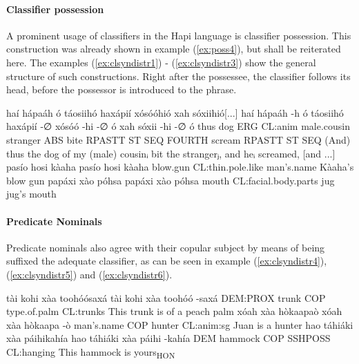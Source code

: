 \documentclass[a4paper, 12pt, oneside]{memoir}
\begin{document}
\paragraph{Classifier possession}
A prominent usage of classifiers in the Hapi language is classifier possession. This construction was already shown in example (\ref{ex:poss4}), but shall be reiterated here. The examples (\ref{ex:clsyndistr1}) - (\ref{ex:clsyndistr3}) show the general structure of such constructions. Right after the possessee, the classifier follows its head, before the possessor is introduced to the phrase. 
\begin{examples}
\newbaarucmd{\cl}{\baarujuncture{\texttt{==}}}
\ex \label{ex:clsyndistr1}
\words haí hápaáh ó táosiihó haxápií xósóóhió xah sóxiihió[...] 
\bits haí hápaáh -h ó táosiihó haxápií -∅ xósóó -hi -∅ \cl ó xah sóxii -hi -∅ \cl ó 
\gloss thus dog ERG CL:anim male.cousin stranger ABS bite RPASTT ST SEQ FOURTH scream RPASTT ST SEQ
\tr (And) thus the dog of my (male) cousinᵢ bit the strangerⱼ, and heᵢ screamed, [and ...]
\ex \label{ex:clsyndistr2}
\words pasío hosi kàaha
\bits pasío hosi kàaha 
\gloss blow.gun CL:thin.pole.like man's.name
\tr Kàaha's blow gun
\ex \label{ex:clsyndistr3}
\words papáxi xào póhsa
\bits papáxi xào póhsa
\gloss mouth CL:facial.body.parts jug
\tr jug's mouth
\end{examples}
\paragraph{Predicate Nominals}
Predicate nominals also agree with their copular subject by means of being suffixed the adequate classifier, as can be seen in example (\ref{ex:clsyndistr4}), (\ref{ex:clsyndistr5}) and (\ref{ex:clsyndistr6}). 
\begin{examples}
\ex \label{ex:clsyndistr4}
\words tài kohi xàa toohóósaxá
\bits tài kohi xàa toohóó -saxá
\gloss DEM:PROX trunk COP type.of.palm CL:trunks
\tr This trunk is of a peach palm
\ex \label{ex:clsyndistr5}
\words xóah xàa hòkaapaò
\bits xóah xàa hòkaapa -ò
\gloss man's.name COP hunter CL:anim:sg
\tr Juan is a hunter
\ex \label{ex:clsyndistr6}
\words hao táhiáki xàa páihikahía
\bits hao táhiáki xàa páihi -kahía
\gloss DEM hammock COP SSHPOSS CL:hanging
\tr This hammock is yours\textsubscript{HON}
\end{examples}
\end{document}
